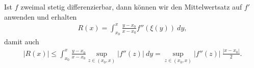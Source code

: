 \documentclass[letterpaper,10pt,english]{jupyterBook}
\begin{document}
Ist \(f\) zweimal stetig differenzierbar, dann können wir den Mittelwertsatz auf \(f'\) anwenden und erhalten
\begin{equation*}
\begin{split} R(x) = \int_{x_0}^x \frac{y-x_0}{x-x_0} f''(\xi(y))~dy,\end{split}
\end{equation*}
damit auch
\begin{equation*}
\begin{split} |R(x)| \leq  \int_{x_0}^x \frac{y-x_0}{x-x_0} \sup_{z \in (x_0,x)} |f''(z)|~dy = \sup_{z \in (x_0,x)} |f''(z)| ~ \frac{|x-x_0|}2.\end{split}
\end{equation*}
\end{document}
